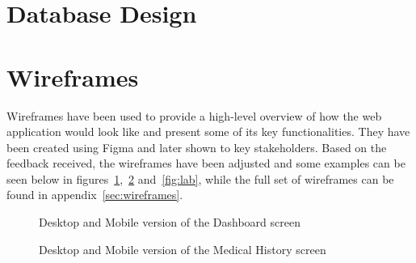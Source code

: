 \FloatBarrier{}

\noindent\begin{minipage}{\textwidth}
    \section{Database Design}
    \begin{center}
        \label{fig:erd}
    \end{center}
\end{minipage}

\FloatBarrier{}

\section{Wireframes}

Wireframes have been used to provide a high-level overview of how the web application would look like and present some of its key functionalities. They have been created using Figma and later shown to key stakeholders. Based on the feedback received, the wireframes have been adjusted and some examples can be seen below in figures~\ref{fig:dashboard},~\ref{fig:medhistory} and~\ref{fig:lab}, while the full set of wireframes can be found in appendix~\ref{sec:wireframes}.

\begin{figure}[ht]
    \centering
    \begin{minipage}[c]{0.70\textwidth}
    \end{minipage}
    \hspace{0.05\textwidth}
    \begin{minipage}[c]{0.20\textwidth}
    \end{minipage}
    \caption{Desktop and Mobile version of the Dashboard screen}\label{fig:dashboard}
\end{figure}

\begin{figure}[ht]
    \centering
    \begin{minipage}[c]{0.70\textwidth}
    \end{minipage}
    \hspace{0.05\textwidth}
    \begin{minipage}[c]{0.20\textwidth}
    \end{minipage}
    \caption{Desktop and Mobile version of the Medical History screen}\label{fig:medhistory}
\end{figure}

